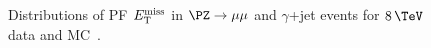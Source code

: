 \begin{figure}
\begin{center}
\end{center}
\caption[Distributions of PF $\MET$ in $\PZ\to\mu\mu$ and $\gamma$+jet events.]
{Distributions of \ac{PF} $\MET$ in $\PZ\to\mu\mu$ and $\gamma$+jet events for
$8\,\TeV$ data and \ac{MC}~\cite{CMS-PAS-JME-12-002}.
}
\label{fig:PFMet}
\end{figure}

